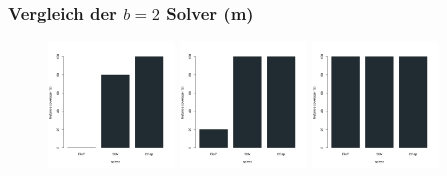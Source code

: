 \documentclass{beamer}
\begin{document}
\begin{frame}
\frametitle{Vergleich der $b = 2$ Solver (m)}

\begin{figure}
\centering
\includegraphics[width=0.3\textwidth]{images/solver_instance_coverage_b=2_m_60s.png}
\includegraphics[width=0.3\textwidth]{images/solver_instance_coverage_b=2_m_600s.png}
\includegraphics[width=0.3\textwidth]{images/solver_instance_coverage_b=2_m_1200s.png}
\caption*{\textsc{Zeitlimit} $1min$ $\quad\quad\quad$ \textsc{Zeitlimit} $10min$ $\quad\quad\quad$ \textsc{Zeitlimit} $20min$}
\begin{subfigure}[b]{0.3\textwidth}
\centering
{}
\end{subfigure}
\end{figure}
\end{frame}
\end{document}
